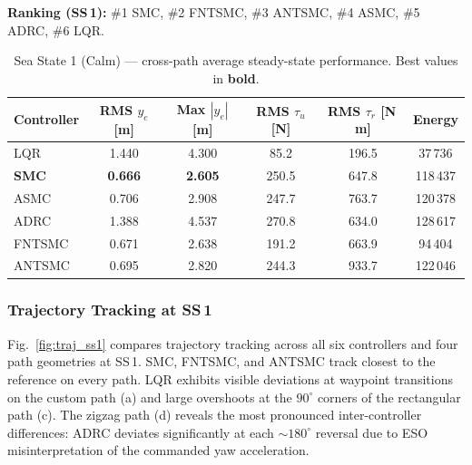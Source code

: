 \documentclass[review]{cas-dc}
\begin{document}
\textbf{Ranking (SS\,1):} \#1 SMC, \#2 FNTSMC, \#3 ANTSMC, \#4 ASMC, \#5 ADRC, \#6 LQR.

\begin{table}[t]
\centering
\caption{Sea State 1 (Calm) --- cross-path average steady-state performance. Best values in \textbf{bold}.}
\label{tab:ss1}
\begin{tabular}{lccccc}
\toprule
Controller & RMS $y_e$ [m] & Max $|y_e|$ [m] & RMS $\tau_u$ [N] & RMS $\tau_r$ [N\,m] & Energy \\
\midrule
LQR & 1.440 & 4.300 & 85.2 & 196.5 & 37\,736 \\
\textbf{SMC} & \textbf{0.666} & \textbf{2.605} & 250.5 & 647.8 & 118\,437 \\
ASMC & 0.706 & 2.908 & 247.7 & 763.7 & 120\,378 \\
ADRC & 1.388 & 4.537 & 270.8 & 634.0 & 128\,617 \\
FNTSMC & 0.671 & 2.638 & 191.2 & 663.9 & 94\,404 \\
ANTSMC & 0.695 & 2.820 & 244.3 & 933.7 & 122\,046 \\
\bottomrule
\end{tabular}
\end{table}

\subsubsection{Trajectory Tracking at SS\,1}

Fig.~\ref{fig:traj_ss1} compares trajectory tracking across all six controllers and four path geometries at SS\,1. SMC, FNTSMC, and ANTSMC track closest to the reference on every path. LQR exhibits visible deviations at waypoint transitions on the custom path (a) and large overshoots at the $90^\circ$ corners of the rectangular path (c). The zigzag path (d) reveals the most pronounced inter-controller differences: ADRC deviates significantly at each ${\sim}180^\circ$ reversal due to ESO misinterpretation of the commanded yaw acceleration.
\end{document}

